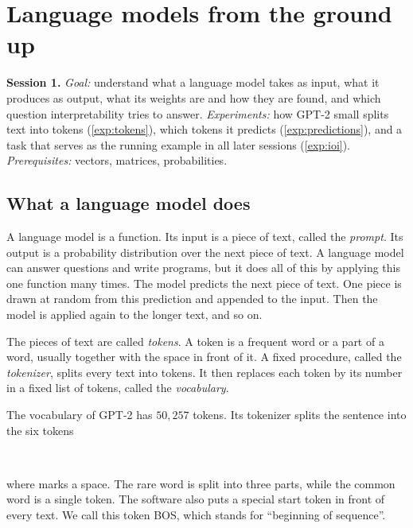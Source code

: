 \section{Language models from the ground up}
\label{sec:lm}

\begin{sessioncard}
\textbf{Session 1.} \emph{Goal:} understand what a language model takes as input, what it produces as output,
what its weights are and how they are found, and which question interpretability tries to answer.
\emph{Experiments:} how GPT-2 small splits text into tokens (\cref{exp:tokens}), which tokens it predicts
(\cref{exp:predictions}), and a task that serves as the running example in all later sessions (\cref{exp:ioi}).
\emph{Prerequisites:} vectors, matrices, probabilities.
\end{sessioncard}

\subsection{What a language model does}

A language model is a function. Its input is a piece of text, called the \emph{prompt}. Its output is a
probability distribution over the next piece of text. A language model can answer questions and write programs,
but it does all of this by applying this one function many times. The model predicts the next piece of text. One
piece is drawn at random from this prediction and appended to the input. Then the model is applied again to the
longer text, and so on.

The pieces of text are called \emph{tokens}. A token is a frequent word or a part of a word, usually together
with the space in front of it. A fixed procedure, called the \emph{tokenizer}, splits every text into tokens. It
then replaces each token by its number in a fixed list of tokens, called the \emph{vocabulary}.

\begin{experiment}[Tokens]\label{exp:tokens} 
The vocabulary of GPT-2 has $50{,}257$ tokens. Its tokenizer splits the sentence 
into the six tokens
\begin{center}
\,\,\,\,\,
\end{center}
where \tok{\textvisiblespace} marks a space. The rare word  is split into three parts,
while the common word  is a single token. The software also puts a special start token
in front of every text. We call this token BOS, which stands for ``beginning of sequence''.
\end{experiment}

